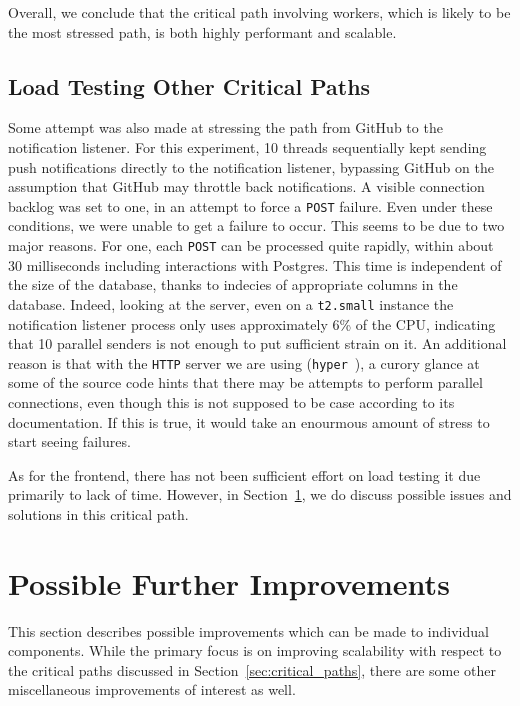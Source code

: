 \documentclass{scrartcl}
\begin{document}
Overall, we conclude that the critical path involving workers, which is likely to be the most stressed path, is both highly performant and scalable.

\subsection{Load Testing Other Critical Paths}
\label{sec:load_testing_other_critical_paths}

Some attempt was also made at stressing the path from GitHub to the notification listener.
For this experiment, 10 threads sequentially kept sending push notifications directly to the notification listener, bypassing GitHub on the assumption that GitHub may throttle back notifications.
A visible connection backlog was set to one, in an attempt to force a \texttt{POST} failure.
Even under these conditions, we were unable to get a failure to occur.
This seems to be due to two major reasons.
For one, each \texttt{POST} can be processed quite rapidly, within about 30 milliseconds including interactions with Postgres.
This time is independent of the size of the database, thanks to indecies of appropriate columns in the database.
Indeed, looking at the server, even on a \texttt{t2.small} instance the notification listener process only uses approximately 6\% of the CPU, indicating that 10 parallel senders is not enough to put sufficient strain on it.
An additional reason is that with the \texttt{HTTP} server we are using (\texttt{hyper}~\cite{hyper}), a curory glance at some of the source code hints that there may be attempts to perform parallel connections, even though this is not supposed to be case according to its documentation.
If this is true, it would take an enourmous amount of stress to start seeing failures.

As for the frontend, there has not been sufficient effort on load testing it due primarily to lack of time.
However, in Section~\ref{sec:performance_improvements}, we do discuss possible issues and solutions in this critical path.

\section{Possible Further Improvements}
\label{sec:performance_improvements}

This section describes possible improvements which can be made to individual components.
While the primary focus is on improving scalability with respect to the critical paths discussed in Section~\ref{sec:critical_paths}, there are some other miscellaneous improvements of interest as well.
\end{document}

